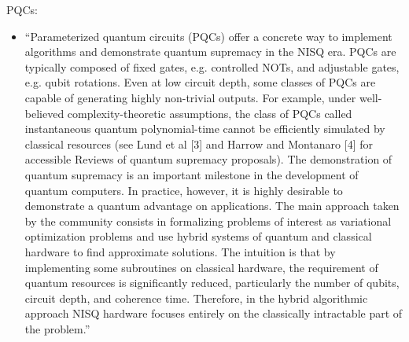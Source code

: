 \documentclass[journal=jacsat,manuscript=article]{achemso}
\begin{document}
PQCs\cite{benedetti_parameterized_2019}:
\begin{itemize}
	\item ``Parameterized quantum circuits (PQCs) offer a concrete way to implement algorithms and demonstrate quantum supremacy in the NISQ era. PQCs are typically composed of fixed gates, e.g. controlled NOTs, and adjustable gates, e.g. qubit rotations. Even at low circuit depth, some classes of PQCs are capable of generating highly non-trivial outputs. For example, under well-believed complexity-theoretic assumptions, the class of PQCs called instantaneous quantum polynomial-time cannot be efficiently simulated by classical resources (see Lund et al [3] and Harrow and Montanaro [4] for accessible Reviews of quantum supremacy proposals). The demonstration of quantum supremacy is an important milestone in the development of quantum computers. In practice, however, it is highly desirable to demonstrate a quantum advantage on applications. The main approach taken by the community consists in formalizing problems of interest as variational optimization problems and use hybrid systems of quantum and classical hardware to find approximate solutions. The intuition is that by implementing some subroutines on classical hardware, the requirement of quantum resources is significantly reduced, particularly the number of qubits, circuit depth, and coherence time. Therefore, in the hybrid algorithmic approach NISQ hardware focuses entirely on the classically intractable part of the problem.''
\end{itemize}
\end{document}
